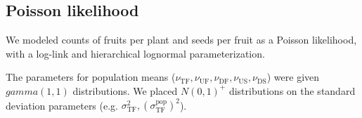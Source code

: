 \documentclass[12pt, oneside, titlepage]{article}   	%
\begin{document}






\subsection*{Poisson likelihood}

We modeled counts of fruits per plant and seeds per fruit as a Poisson likelihood, with a log-link and hierarchical lognormal parameterization. 

The parameters for population means ($\nu_\mathrm{TF},\nu_\mathrm{UF},\nu_\mathrm{DF},\nu_\mathrm{US},\nu_\mathrm{DS}$) were given $gamma(1,1)$ distributions. We placed $N(0,1)^+$ distributions on the standard deviation parameters (e.g. $\sigma^2_\mathrm{TF}, (\sigma^\mathrm{pop}_\mathrm{TF})^2$).
\end{document}
